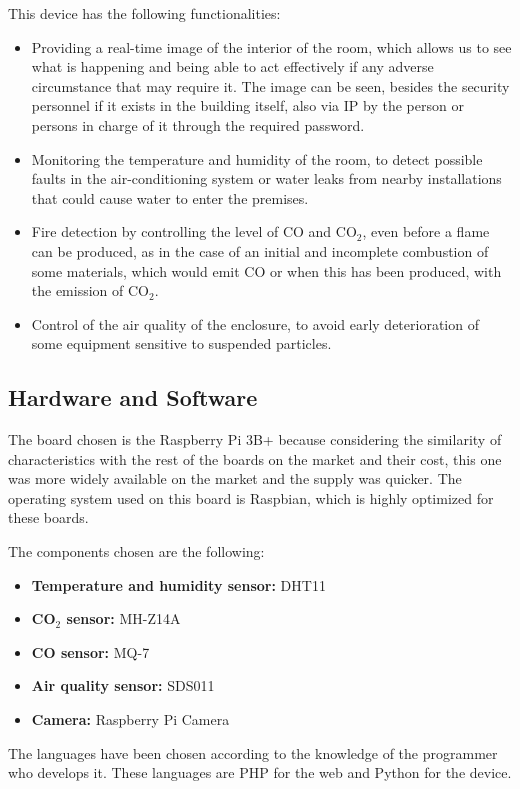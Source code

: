 This device has the following functionalities:
\begin{itemize}
	\item Providing a real-time image of the interior of the room, which allows us to see what is happening and being able to act effectively if any adverse circumstance that may require it. The image can be seen, besides the security personnel if it exists in the building itself, also via IP by the person or persons in charge of it through the required password.
	\item Monitoring the temperature and humidity of the room, to detect possible faults in the air-conditioning system or water leaks from nearby installations that could cause water to enter the premises.
	\item Fire detection by controlling the level of CO and CO$_2$, even before a flame can be produced, as in the case of an initial and incomplete combustion of some materials, which would emit CO or when this has been produced, with the emission of CO$_2$.
	\item Control of the air quality of the enclosure, to avoid early deterioration of some equipment sensitive to suspended particles.
\end{itemize}

\subsection{Hardware and Software}\label{subsec:hardware-and-software}
The board chosen is the Raspberry Pi 3B+ because considering the similarity of characteristics with the rest of the boards on the market and their cost, this one was more widely available on the market and the supply was quicker. The operating system used on this board is Raspbian, which is highly optimized for these boards.

The components chosen are the following:
\begin{itemize}
	\item \textbf{Temperature and humidity sensor:} DHT11
	\item \textbf{CO$_2$ sensor:} MH-Z14A
	\item \textbf{CO sensor:} MQ-7
	\item \textbf{Air quality sensor:} SDS011
	\item \textbf{Camera:} Raspberry Pi Camera
\end{itemize}

The languages have been chosen according to the knowledge of the programmer who develops it. These languages are PHP for the web and Python for the device.

